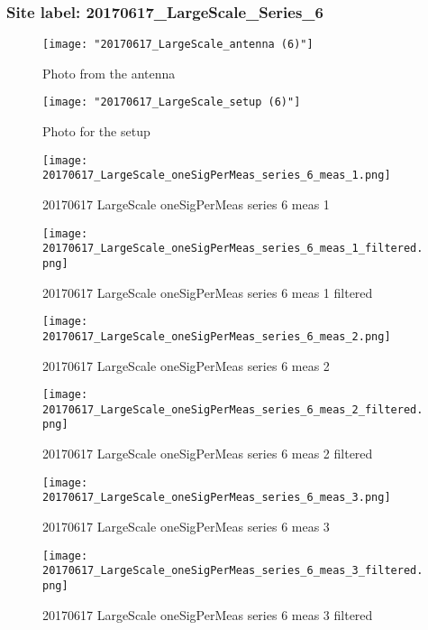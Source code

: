 \subsubsection{Site label: 20170617\_LargeScale\_Series\_6}
\begin{figure}[ht] \caption{Photo from the antenna}
\texttt{[image: "20170617\_LargeScale\_antenna (6)"]}\centering\end{figure}
\begin{figure}[ht] \caption{Photo for the setup}
\texttt{[image: "20170617\_LargeScale\_setup (6)"]}\centering\end{figure}
\begin{figure}[ht] \caption{20170617 LargeScale oneSigPerMeas series 6 meas 1}
\texttt{[image: 20170617\_LargeScale\_oneSigPerMeas\_series\_6\_meas\_1.png]}\centering\end{figure}
\begin{figure}[ht] \caption{20170617 LargeScale oneSigPerMeas series 6 meas 1 filtered}
\texttt{[image: 20170617\_LargeScale\_oneSigPerMeas\_series\_6\_meas\_1\_filtered.png]}\centering\end{figure}
\begin{figure}[ht] \caption{20170617 LargeScale oneSigPerMeas series 6 meas 2}
\texttt{[image: 20170617\_LargeScale\_oneSigPerMeas\_series\_6\_meas\_2.png]}\centering\end{figure}
\begin{figure}[ht] \caption{20170617 LargeScale oneSigPerMeas series 6 meas 2 filtered}
\texttt{[image: 20170617\_LargeScale\_oneSigPerMeas\_series\_6\_meas\_2\_filtered.png]}\centering\end{figure}
\begin{figure}[ht] \caption{20170617 LargeScale oneSigPerMeas series 6 meas 3}
\texttt{[image: 20170617\_LargeScale\_oneSigPerMeas\_series\_6\_meas\_3.png]}\centering\end{figure}
\begin{figure}[ht] \caption{20170617 LargeScale oneSigPerMeas series 6 meas 3 filtered}
\texttt{[image: 20170617\_LargeScale\_oneSigPerMeas\_series\_6\_meas\_3\_filtered.png]}\centering\end{figure}
\clearpage
